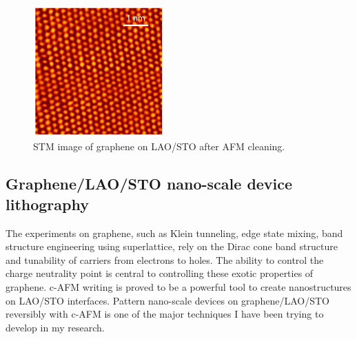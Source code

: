 \documentclass[pdflatex, sectionletters, 12pt]{pittetd}    %
\begin{document}
\begin{figure}[h!]
	\centering
	\includegraphics[width=0.45\textwidth]{Drawing/GrapheneSTM.pdf}
	\caption{STM image of graphene on LAO/STO after AFM cleaning.}
	\label{FIG:GrapheneSTM}
\end{figure}



\subsection{Graphene/LAO/STO nano-scale device lithography}

The experiments on graphene, such as Klein tunneling\cite{allain2011klein, katsnelson2006chiral, young2009quantum, shytov2008klein}, edge state mixing\cite{williams2007quantum, abanin2007quantized, lohmann2009four, amet2014selective}, band structure engineering using superlattice\cite{forsythe2018band}, rely on the Dirac cone band structure and tunability of carriers from electrons to holes. The ability to control the charge neutrality point is central to controlling these exotic properties of graphene. c-AFM writing is proved to be a powerful tool to create nanostructures on LAO/STO interfaces. Pattern nano-scale devices on graphene/LAO/STO reversibly with c-AFM is one of the major techniques I have been trying to develop in my research. 
\end{document}
